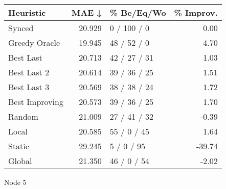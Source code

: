 \begin{tabular}{lrlr}
\toprule
\textbf{Heuristic} & \textbf{MAE ↓} & \textbf{\% Be/Eq/Wo} & \textbf{\% Improv.} \\
\midrule
            Synced &         20.929 &          0 / 100 / 0 &                0.00 \\
     Greedy Oracle &         19.945 &          48 / 52 / 0 &                4.70 \\
         Best Last &         20.713 &         42 / 27 / 31 &                1.03 \\
       Best Last 2 &         20.614 &         39 / 36 / 25 &                1.51 \\
       Best Last 3 &         20.569 &         38 / 38 / 24 &                1.72 \\
    Best Improving &         20.573 &         39 / 36 / 25 &                1.70 \\
            Random &         21.009 &         27 / 41 / 32 &               -0.39 \\
             Local &         20.585 &          55 / 0 / 45 &                1.64 \\
            Static &         29.245 &           5 / 0 / 95 &              -39.74 \\
            Global &         21.350 &          46 / 0 / 54 &               -2.02 \\
\bottomrule
\end{tabular}
\caption{Node 5}
\label{tab:non_lr05_le1_bs2_5}
